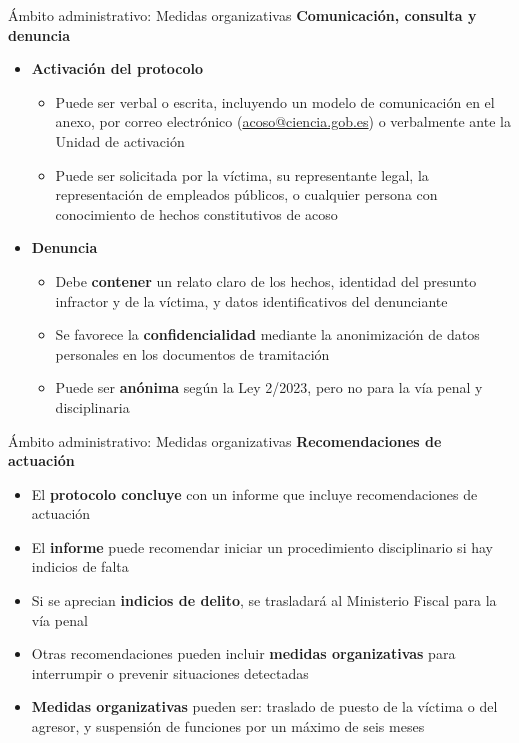 \documentclass{beamer}
\begin{document}
    \begin{frame}{Ámbito administrativo: Medidas organizativas}
        \textbf{Comunicación, consulta y denuncia}
        \begin{itemize}
            \item \textbf{Activación del protocolo}
            \begin{itemize}
                \item Puede ser verbal o escrita, incluyendo un modelo de comunicación en el anexo, por correo electrónico (\href{mailto:acoso@ciencia.gob.es}{acoso@ciencia.gob.es}) o verbalmente ante la Unidad de activación
                \item Puede ser solicitada por la víctima, su representante legal, la representación de empleados públicos, o cualquier persona con conocimiento de hechos constitutivos de acoso
            \end{itemize}
            \item \textbf{Denuncia}
            \begin{itemize}
                \item Debe \textbf{contener} un relato claro de los hechos, identidad del presunto infractor y de la víctima, y datos identificativos del denunciante
                \item Se favorece la \textbf{confidencialidad} mediante la anonimización de datos personales en los documentos de tramitación
                \item Puede ser \textbf{anónima} según la Ley 2/2023, pero no para la vía penal y disciplinaria
            \end{itemize}
        \end{itemize}
    \end{frame}

    \begin{frame}{Ámbito administrativo: Medidas organizativas}
        \textbf{Recomendaciones de actuación}
        \begin{itemize}
            \item El \textbf{protocolo concluye} con un informe que incluye recomendaciones de actuación
            \item El \textbf{informe} puede recomendar iniciar un procedimiento disciplinario si hay indicios de falta
            \item Si se aprecian \textbf{indicios de delito}, se trasladará al Ministerio Fiscal para la vía penal
            \item Otras recomendaciones pueden incluir \textbf{medidas organizativas} para interrumpir o prevenir situaciones detectadas
            \item \textbf{Medidas organizativas} pueden ser: traslado de puesto de la víctima o del agresor, y suspensión de funciones por un máximo de seis meses
        \end{itemize}
    \end{frame}
\end{document}

